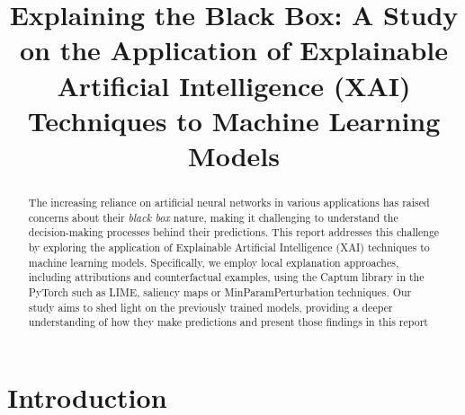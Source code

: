 \documentclass[conference]{IEEEtran}
\begin{document}
\title{Explaining the Black Box: A Study on the Application of Explainable Artificial Intelligence (XAI) Techniques to Machine Learning Models}
\author{
    \and
}

\maketitle

\begin{abstract}

    The increasing reliance on artificial neural networks in various applications has raised concerns about their \textit{black box} nature, making it challenging to understand the decision-making processes behind their predictions.
    This report addresses this challenge by exploring the application of Explainable Artificial Intelligence (XAI) techniques to machine learning models.
    Specifically, we employ local explanation approaches, including attributions and counterfactual examples, using the Captum library in the PyTorch such as LIME, saliency maps or MinParamPerturbation techniques.
    Our study aims to shed light on the previously trained models, providing a deeper understanding of how they make predictions and present those findings in this report

\end{abstract}

\section{Introduction}\label{sec:introduction}
\end{document}
